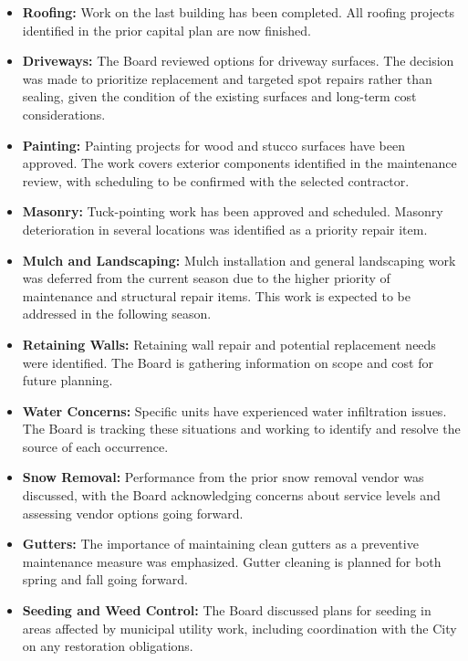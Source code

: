\documentclass[11pt]{article}
\newcommand{\strong}[1]{\textbf{#1}}
\begin{document}
\begin{itemize}[leftmargin=1.1em]
    \item \strong{Roofing:} Work on the last building has been completed. All roofing projects
    identified in the prior capital plan are now finished.

    \item \strong{Driveways:} The Board reviewed options for driveway surfaces. The decision
    was made to prioritize replacement and targeted spot repairs rather than sealing, given
    the condition of the existing surfaces and long-term cost considerations.

    \item \strong{Painting:} Painting projects for wood and stucco surfaces have been approved.
    The work covers exterior components identified in the maintenance review, with scheduling
    to be confirmed with the selected contractor.

    \item \strong{Masonry:} Tuck-pointing work has been approved and scheduled. Masonry
    deterioration in several locations was identified as a priority repair item.

    \item \strong{Mulch and Landscaping:} Mulch installation and general landscaping work was
    deferred from the current season due to the higher priority of maintenance and structural
    repair items. This work is expected to be addressed in the following season.

    \item \strong{Retaining Walls:} Retaining wall repair and potential replacement needs were
    identified. The Board is gathering information on scope and cost for future planning.

    \item \strong{Water Concerns:} Specific units have experienced water infiltration issues.
    The Board is tracking these situations and working to identify and resolve the source of
    each occurrence.

    \item \strong{Snow Removal:} Performance from the prior snow removal vendor was discussed,
    with the Board acknowledging concerns about service levels and assessing vendor options
    going forward.

    \item \strong{Gutters:} The importance of maintaining clean gutters as a preventive
    maintenance measure was emphasized. Gutter cleaning is planned for both spring and fall
    going forward.

    \item \strong{Seeding and Weed Control:} The Board discussed plans for seeding in areas
    affected by municipal utility work, including coordination with the City on any restoration
    obligations.
\end{itemize}
\end{document}
